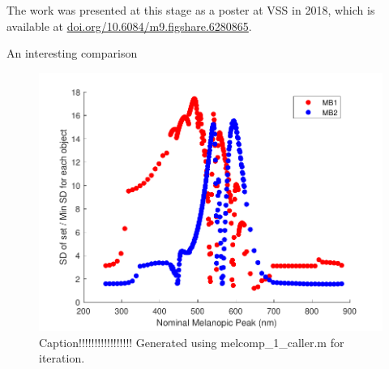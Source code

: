 \documentclass{article}
\begin{document}
The work was presented at this stage as a poster at VSS in 2018, which is available at \url{doi.org/10.6084/m9.figshare.6280865}.

An interesting comparison

\begin{figure}[ht]
    \centering
    \includegraphics{figs/setoverobj.pdf}
    \caption{Caption!!!!!!!!!!!!!!!!! Generated using melcomp\_1\_caller.m for iteration.}
    \label{fig:setoverobj}
\end{figure} 











\end{document}
